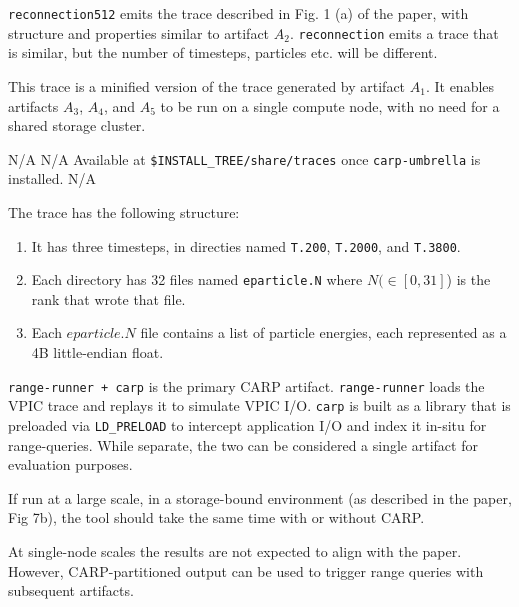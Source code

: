 \documentclass[conference]{IEEEtran}
\begin{document}
\artout

\texttt{reconnection512} emits the trace described in Fig. 1 (a) of the paper, with structure and properties similar to artifact $A_2$. \texttt{reconnection} emits a trace that is similar, but the number of timesteps, particles etc. will be different.


\newartifact

\artrel

This trace is a minified version of the trace generated by artifact $A_1$. It enables artifacts $A_3$, $A_4$, and $A_5$ to be run on a single compute node, with no need for a shared storage cluster.

\artexp
N/A
\arttime
N/A
\artin
Available at \texttt{\$INSTALL\_TREE/share/traces} once \texttt{carp-umbrella} is installed.
\artcomp
N/A
\artout

The trace has the following structure:

\begin{enumerate}
    \item It has three timesteps, in directies named \texttt{T.200}, \texttt{T.2000}, and \texttt{T.3800}.
    \item Each directory has 32 files named \texttt{eparticle.N} where $N (\in [0, 31]$) is the rank that wrote that file.
    \item Each $eparticle.N$ file contains a list of particle energies, each represented as a 4B little-endian float.
\end{enumerate}



\newartifact

\artrel

\texttt{range-runner + carp} is the primary CARP artifact. \texttt{range-runner} loads the VPIC trace and replays it to simulate VPIC I/O. \texttt{carp} is built as a library that is preloaded via \texttt{LD\_PRELOAD} to intercept application I/O and index it in-situ for range-queries. While separate, the two can be considered a single artifact for evaluation purposes.

\artexp

If run at a large scale, in a storage-bound environment (as described in the paper, Fig 7b), the tool should take the same time with or without CARP.

At single-node scales the results are not expected to align with the paper. However, CARP-partitioned output can be used to trigger range queries with subsequent artifacts.
\end{document}
